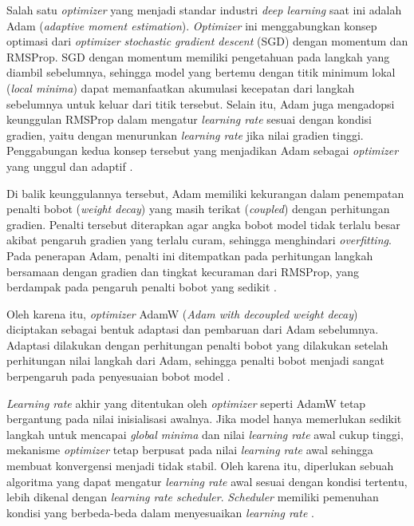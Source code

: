 Salah satu \textit{optimizer} yang menjadi standar industri \textit{deep learning} saat ini adalah Adam (\textit{adaptive moment estimation}).
\textit{Optimizer} ini menggabungkan konsep optimasi dari \textit{optimizer} \textit{stochastic gradient descent} (SGD) dengan momentum dan RMSProp.
SGD dengan momentum memiliki pengetahuan pada langkah yang diambil sebelumnya, sehingga model yang bertemu dengan titik minimum lokal (\textit{local minima}) dapat memanfaatkan akumulasi kecepatan dari langkah sebelumnya untuk keluar dari titik tersebut. 
Selain itu, Adam juga mengadopsi keunggulan RMSProp dalam mengatur \textit{learning rate} sesuai dengan kondisi gradien, yaitu dengan menurunkan \textit{learning rate} jika nilai gradien tinggi. 
Penggabungan kedua konsep tersebut yang menjadikan Adam sebagai \textit{optimizer} yang unggul dan adaptif \cite{kingma2014adam}. \par

Di balik keunggulannya tersebut, Adam memiliki kekurangan dalam penempatan penalti bobot (\textit{weight decay}) yang masih terikat (\textit{coupled}) dengan perhitungan gradien.
Penalti tersebut diterapkan agar angka bobot model tidak terlalu besar akibat pengaruh gradien yang terlalu curam, sehingga menghindari \textit{overfitting}.
Pada penerapan Adam, penalti ini ditempatkan pada perhitungan langkah bersamaan dengan gradien dan tingkat kecuraman dari RMSProp, yang berdampak pada pengaruh penalti bobot yang sedikit \cite{loshchilov2018decoupled}. \par

Oleh karena itu, \textit{optimizer} AdamW (\textit{Adam with decoupled weight decay}) diciptakan sebagai bentuk adaptasi dan pembaruan dari Adam sebelumnya. 
Adaptasi dilakukan dengan perhitungan penalti bobot yang dilakukan setelah perhitungan nilai langkah dari Adam, sehingga penalti bobot menjadi sangat berpengaruh pada penyesuaian bobot model \cite{loshchilov2018decoupled}. \par

\textit{Learning rate} akhir yang ditentukan oleh \textit{optimizer} seperti AdamW tetap bergantung pada nilai inisialisasi awalnya.
Jika model hanya memerlukan sedikit langkah untuk mencapai \textit{global minima} dan nilai \textit{learning rate} awal cukup tinggi, mekanisme \textit{optimizer} tetap berpusat pada nilai \textit{learning rate} awal sehingga membuat konvergensi menjadi tidak stabil.
Oleh karena itu, diperlukan sebuah algoritma yang dapat mengatur \textit{learning rate} awal sesuai dengan kondisi tertentu, lebih dikenal dengan \textit{learning rate scheduler}. 
\textit{Scheduler} memiliki pemenuhan kondisi yang berbeda-beda dalam menyesuaikan \textit{learning rate} \cite{goodfellow2016deep}. \par

